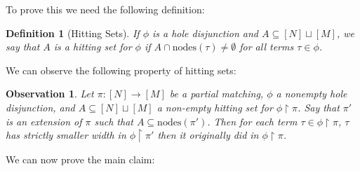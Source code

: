 \documentclass[11pt]{article}
\newtheorem{definition}{Definition}
\newtheorem{observation}{Observation}
\newcommand{\nodes}{\mathrm{nodes}}
\begin{document}
To prove this we need the following definition:
\begin{definition}[Hitting Sets]
If $\phi$ is a hole disjunction and $A \subseteq [N] \sqcup [M]$, we say that $A$ is a hitting set for $\phi$ if $A \cap \nodes(\tau)  \neq \emptyset$ for all terms $\tau \in \phi$. 
\end{definition}
We can observe the following property of hitting sets:
\begin{observation}\label{obs:width-killing}
Let $\pi: [N] \to [M]$ be a partial matching, $\phi$ a nonempty hole disjunction, and $A\subseteq [N] \sqcup [M]$ a non-empty hitting set for $\phi\upharpoonright\pi$.  Say that $\pi'$ is an extension of $\pi$ such that $A \subseteq \nodes(\pi')$. Then for each term $\tau \in \phi\upharpoonright\pi$, $\tau$ has strictly smaller width in $\phi\upharpoonright\pi'$ then it originally did in $\phi\upharpoonright\pi$. 
\end{observation}
We can now prove the main claim:
\end{document}
